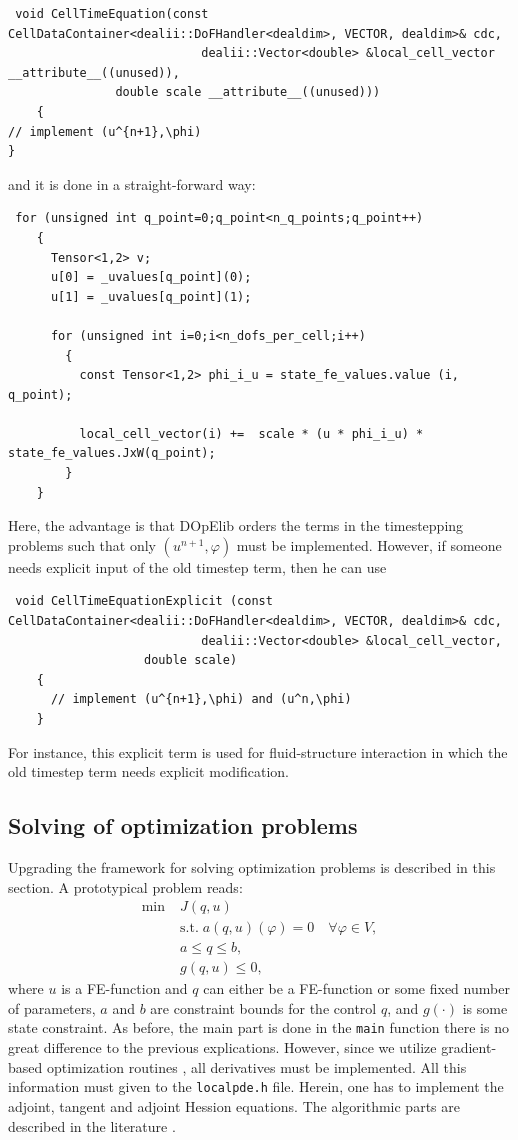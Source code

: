\documentclass[prodmode,acmtoms]{acmsmall}
\numberwithin{equation}{section}
\renewcommand{\phi}{\varphi}
\begin{document}
\begin{lstlisting}
 void CellTimeEquation(const CellDataContainer<dealii::DoFHandler<dealdim>, VECTOR, dealdim>& cdc,
                           dealii::Vector<double> &local_cell_vector __attribute__((unused)),
		       double scale __attribute__((unused)))
    {
// implement (u^{n+1},\phi) 
}
\end{lstlisting}
and it is done in a straight-forward way:
\begin{lstlisting}
 for (unsigned int q_point=0;q_point<n_q_points;q_point++)
	{
	  Tensor<1,2> v;
	  u[0] = _uvalues[q_point](0);
	  u[1] = _uvalues[q_point](1);

	  for (unsigned int i=0;i<n_dofs_per_cell;i++)
	    {
	      const Tensor<1,2> phi_i_u = state_fe_values.value (i, q_point);

	      local_cell_vector(i) +=  scale * (u * phi_i_u) * state_fe_values.JxW(q_point);
	    }
	}
\end{lstlisting}
Here, the advantage is that DOpElib orders the terms in the timestepping
problems
such that only $(u^{n+1},\phi)$ must be implemented. However, if someone 
needs explicit input of the old timestep term, then he can use 
\begin{lstlisting}
 void CellTimeEquationExplicit (const CellDataContainer<dealii::DoFHandler<dealdim>, VECTOR, dealdim>& cdc,
                           dealii::Vector<double> &local_cell_vector,
				   double scale)
    {
      // implement (u^{n+1},\phi) and (u^n,\phi)  
    }
    \end{lstlisting}
    For instance, this explicit term is used for fluid-structure interaction in
    which
    the old timestep term needs explicit modification.   





\subsection{Solving of optimization problems}
Upgrading the framework for solving optimization problems
is described in this section. A prototypical problem reads:
\begin{align*}
\min\;&J(q,u) \\
  &\text{s.t.}\; a(q,u)(\phi) = 0 \quad \forall \phi\in V,\\
  &a \le q \le b,\\
  &g(q,u) \le 0,  
\end{align*}
where $u$ is a FE-function and $q$ can either be a FE-function or some 
fixed number of parameters, $a$ and $b$ are constraint bounds for the control $q$,
and $g(\cdot)$ is some state constraint.
As before, the main part is done in the \texttt{main} function there is no
great difference to the previous explications. However, 
since we utilize gradient-based optimization routines \cite{...},
all derivatives must be implemented. All this information
must given to the \texttt{localpde.h} file. Herein, one has to 
implement the adjoint, tangent and adjoint Hession equations. 
The algorithmic parts are described in the literature \cite{BeMeVe06}.
\end{document}
